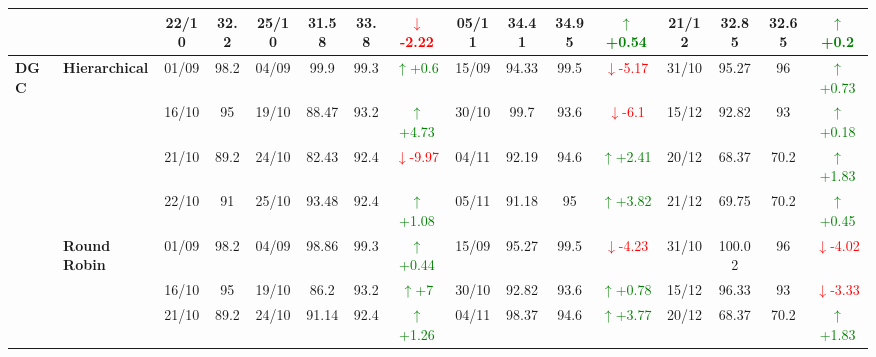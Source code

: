 \documentclass{ieeeaccess}
\begin{document}
{\begin{longtable}{llcc|cccc|cccc|cccc}
&
& 22/10 & 32.2 & 25/10 & 31.58 & 33.8 & \textcolor{red}{\(\downarrow\)-2.22} & 05/11 & 34.41 & 34.95 & \textcolor{green}{\(\uparrow\)+0.54} & 21/12 & 32.85 & 32.65 & \textcolor{green}{\(\uparrow\)+0.2} \\
\midrule




\multirow{12}{*}{\textbf{DGC}} 
& \textbf{Hierarchical}
& 01/09 & 98.2 & 04/09 & 99.9 & 99.3 & \textcolor{green}{\(\uparrow\)+0.6} & 15/09 & 94.33 & 99.5 & \textcolor{red}{\(\downarrow\)-5.17} & 31/10 & 95.27 & 96 & \textcolor{green}{\(\uparrow\)+0.73} \\

&
& 16/10 & 95 & 19/10 & 88.47 & 93.2 & \textcolor{green}{\(\uparrow\)+4.73} & 30/10 & 99.7 & 93.6 & \textcolor{red}{\(\downarrow\)-6.1} & 15/12 & 92.82 & 93 & \textcolor{green}{\(\uparrow\)+0.18} \\

&
& 21/10 & 89.2 & 24/10 & 82.43 & 92.4 & \textcolor{red}{\(\downarrow\)-9.97} & 04/11 & 92.19 & 94.6 & \textcolor{green}{\(\uparrow\)+2.41} & 20/12 & 68.37 & 70.2 & \textcolor{green}{\(\uparrow\)+1.83} \\

&
& 22/10 & 91 & 25/10 & 93.48 & 92.4 & \textcolor{green}{\(\uparrow\)+1.08} & 05/11 & 91.18 & 95 & \textcolor{green}{\(\uparrow\)+3.82} & 21/12 & 69.75 & 70.2 & \textcolor{green}{\(\uparrow\)+0.45} \\
\cmidrule(lr){2-16}


& \textbf{Round Robin}
& 01/09 & 98.2 & 04/09 & 98.86 & 99.3 & \textcolor{green}{\(\uparrow\)+0.44} & 15/09 & 95.27 & 99.5 & \textcolor{red}{\(\downarrow\)-4.23} & 31/10 & 100.02 & 96 & \textcolor{red}{\(\downarrow\)-4.02} \\

&
& 16/10 & 95 & 19/10 & 86.2 & 93.2 & \textcolor{green}{\(\uparrow\)+7} & 30/10 & 92.82 & 93.6 & \textcolor{green}{\(\uparrow\)+0.78} & 15/12 & 96.33 & 93 & \textcolor{red}{\(\downarrow\)-3.33} \\

&
& 21/10 & 89.2 & 24/10 & 91.14 & 92.4 & \textcolor{green}{\(\uparrow\)+1.26} & 04/11 & 98.37 & 94.6 & \textcolor{green}{\(\uparrow\)+3.77} & 20/12 & 68.37 & 70.2 & \textcolor{green}{\(\uparrow\)+1.83} \\


\end{longtable}}
\end{document}
